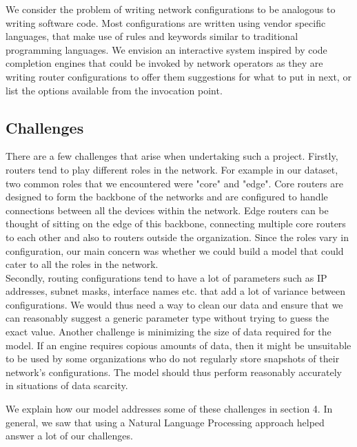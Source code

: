 We consider the problem of writing network configurations to be analogous to writing software code. Most configurations are written using vendor specific languages, that make use of rules and keywords similar to traditional programming languages. We envision an interactive system inspired by code completion engines that could be invoked by network operators as they are writing router configurations to offer them suggestions for what to put in next, or list the options available from the invocation point. 

\subsection{Challenges}
There are a few challenges that arise when undertaking such a project. Firstly, routers tend to play different roles in the network. For example in our dataset, two common roles that we encountered were "core" and "edge". Core routers are designed to form the backbone of the networks and are configured to handle connections between all the devices within the network. Edge routers can be thought of sitting on the edge of this backbone, connecting multiple core routers to each other and also to routers outside the organization. Since the roles vary in configuration, our main concern was whether we could build a model that could cater to all the roles in the network.\\

Secondly, routing configurations tend to have a lot of parameters such as IP addresses, subnet masks, interface names etc. that add a lot of variance between configurations. We would thus need a way to clean our data and ensure that we can reasonably suggest a generic parameter type without trying to guess the exact value. Another challenge is minimizing the size of data required for the model. If an engine requires copious amounts of data, then it might be unsuitable to be used by some organizations who do not regularly store snapshots of their network's configurations. The model should thus perform reasonably accurately in situations of data scarcity. 

We explain how our model addresses some of these challenges in section 4. In general, we saw that using a Natural Language Processing approach helped answer a lot of our challenges.

